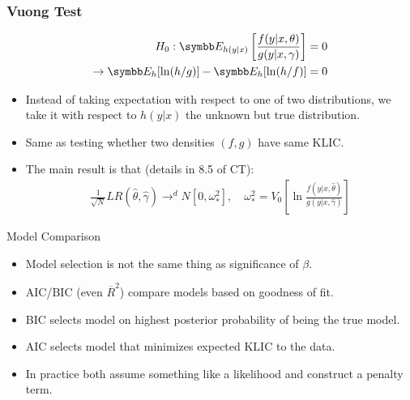\documentclass[aspectratio=169,11pt]{beamer}
\begin{document}
\begin{frame}
\frametitle{Vuong Test}
\small
\begin{align*}
H_0: \E_{h(y|x)} \left[ \frac{ f(y | x,\theta) }{g(y | x, \gamma)} \right] = 0  \\
\rightarrow \E_h[\ln(h/g)] - \E_h[\ln (h/f)] = 0
\end{align*}
\begin{itemize}
\item Instead of taking expectation with respect to one of two distributions, we take it with respect to $h(y |x)$ the unknown but \alert{true distribution}.
\item Same as testing whether two densities $(f,g)$ have same KLIC.
\item The main result is that (details in 8.5 of CT):
\begin{align*}
\frac{1}{\sqrt{N}} LR(\hat{\theta},\hat{\gamma}) \rightarrow^d N [0,\omega_{*}^2],\quad \omega_{*}^2 =  V_0 \left[ \ln \frac{f(y| x, \hat{\theta})}{g(y| x, \hat{\gamma})}  \right]
\end{align*}
\end{itemize}
\end{frame}

\begin{frame}{Model Comparison}
\begin{itemize}
\item Model selection is not the same thing as significance of $\beta$.
\item AIC/BIC (even $\overline{R}^2$) compare models based on goodness of fit.
\item BIC selects model on highest posterior probability of being the true model.
\item AIC selects model that minimizes expected KLIC to the data. 
\item In practice both assume something like a likelihood and construct a penalty term.
\end{itemize}

\end{frame}
\end{document}
